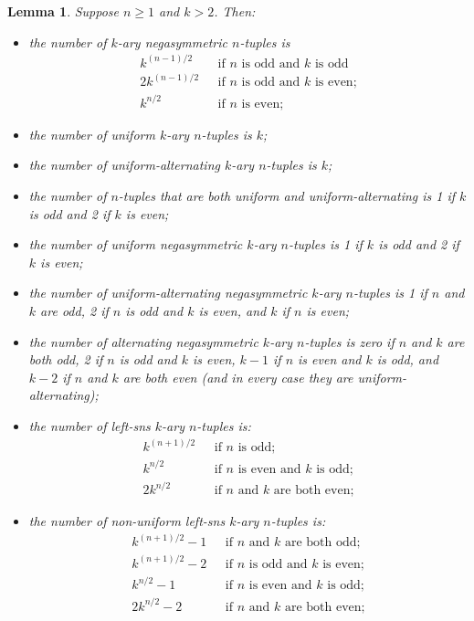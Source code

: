 \documentclass[10pt,a4paper]{amsart}
\newtheorem{lemma}{Lemma}
\begin{document}
\begin{lemma}  \label{lemma:NOS_tuple_numbers}
Suppose $n\geq1$ and $k>2$.  Then:
\begin{itemize}
\item[i)]  the number of $k$-ary negasymmetric $n$-tuples is
\begin{align*}
k^{(n-1)/2} & \mbox{~~if $n$ is odd and $k$ is odd} \\
2k^{(n-1)/2} & \mbox{~~if $n$ is odd and $k$ is even;} \\
k^{n/2} & \mbox{~~if $n$ is even;}
\end{align*}
\item[ii)] the number of uniform $k$-ary $n$-tuples is $k$;
\item[iii)] the number of uniform-alternating $k$-ary $n$-tuples is $k$;
\item[iv)] the number of $n$-tuples that are both uniform and uniform-alternating is 1 if
    $k$ is odd and 2 if $k$ is even;
\item[v)] the number of uniform negasymmetric $k$-ary $n$-tuples is 1 if $k$ is odd and 2 if
    $k$ is even;
\item[vi)] the number of uniform-alternating negasymmetric $k$-ary $n$-tuples is 1 if $n$ and
    $k$ are odd, 2 if $n$ is odd and $k$ is even, and $k$ if $n$ is even;
\item[vii)] the number of alternating negasymmetric $k$-ary $n$-tuples is zero if $n$ and $k$
    are both odd, 2 if $n$ is odd and $k$ is even, $k-1$ if $n$ is even and $k$ is odd, and
    $k-2$ if $n$ and $k$ are both even (and in every case they are uniform-alternating);
\item[viii)] the number of left-sns $k$-ary $n$-tuples is:
\begin{align*}
k^{(n+1)/2} & \mbox{~~if $n$ is odd;} \\
k^{n/2} & \mbox{~~if $n$ is even and $k$ is odd;} \\
2k^{n/2} & \mbox{~~if $n$ and $k$ are both even;}
\end{align*}
\item[ix)] the number of non-uniform left-sns $k$-ary $n$-tuples is:
\begin{align*}
k^{(n+1)/2}-1 & \mbox{~~if $n$ and $k$ are both odd;} \\
k^{(n+1)/2}-2 & \mbox{~~if $n$ is odd and $k$ is even;} \\
k^{n/2}-1 & \mbox{~~if $n$ is even and $k$ is odd;} \\
2k^{n/2}-2 & \mbox{~~if $n$ and $k$ are both even;}

\end{align*}
\end{itemize}
\end{lemma}
\end{document}
